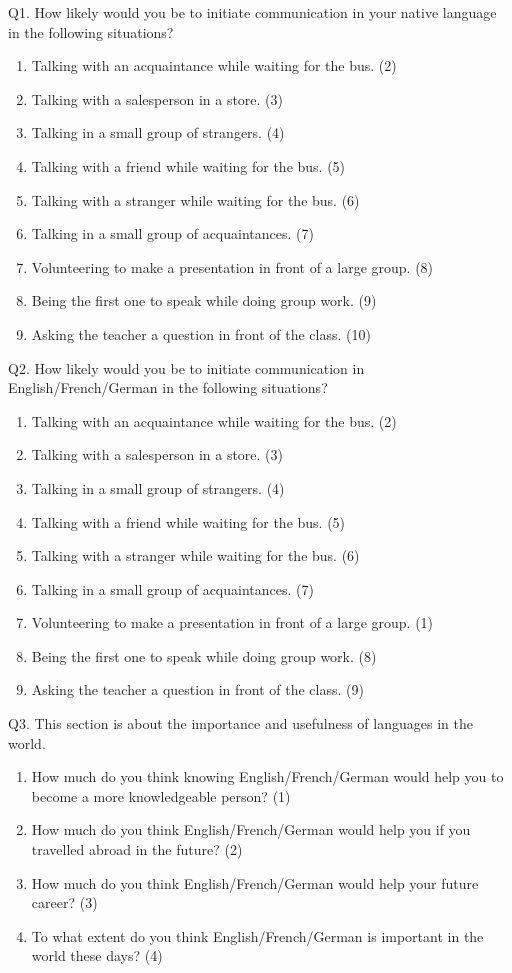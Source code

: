 \documentclass[output=paper]{langsci/langscibook}
\begin{document}
Q1. How likely would you be to initiate communication in your native language in the following situations?

\begin{enumerate}
\item Talking with an acquaintance while waiting for the bus. (2)
\item Talking with a salesperson in a store. (3)
\item Talking in a small group of strangers. (4)
\item Talking with a friend while waiting for the bus. (5)
\item Talking with a stranger while waiting for the bus. (6)
\item Talking in a small group of acquaintances. (7)
\item Volunteering to make a presentation in front of a large group. (8)
\item Being the first one to speak while doing group work. (9)
\item Asking the teacher a question in front of the class. (10)
\end{enumerate}


Q2. How likely would you be to initiate communication in {English}/French/{Ger\-man} in the following situations?

\begin{enumerate}
\item Talking with an acquaintance while waiting for the bus. (2)
\item Talking with a salesperson in a store. (3)
\item Talking in a small group of strangers. (4)
\item Talking with a friend while waiting for the bus. (5)
\item Talking with a stranger while waiting for the bus. (6)
\item Talking in a small group of acquaintances. (7)
\item Volunteering to make a presentation in front of a large group. (1)
\item Being the first one to speak while doing group work. (8)
\item Asking the teacher a question in front of the class. (9)
\end{enumerate}

Q3. This section is about the importance and usefulness of languages in the world.

\begin{enumerate}
\item How much do you think knowing {English}/French/{German} would help you to become a more knowledgeable person? (1)
\item How much do you think {English}/French/{German} would help you if you travelled abroad in the future? (2)
\item How much do you think {English}/French/{German} would help your future career? (3)
\item To what extent do you think {English}/French/{German} is important in the world these days? (4)
\end{enumerate}
\end{document}
